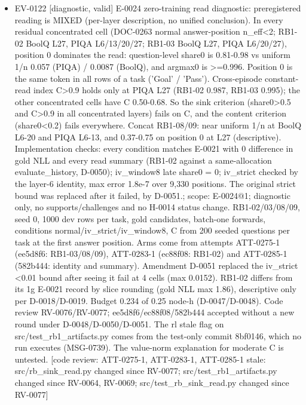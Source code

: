 \documentclass[11pt]{article}
\begin{document}
\begin{itemize}
\item EV-0122 [diagnostic, valid] E-0024 zero-training read diagnostic: preregistered reading is MIXED (per-layer description, no unified conclusion). In every residual concentrated cell (DOC-0263 normal answer-position n\_eff\textless{}2; RB1-02 BoolQ L27, PIQA L6/13/20/27; RB1-03 BoolQ L27, PIQA L6/20/27), position 0 dominates the read: question-level share0 is 0.81-0.98 vs uniform 1/n 0.057 (PIQA) / 0.0087 (BoolQ), and argmax0 is \textgreater{}=0.996. Position 0 is the same token in all rows of a task ('Goal' / 'Pass'). Cross-episode constant-read index C\textgreater{}0.9 holds only at PIQA L27 (RB1-02 0.987, RB1-03 0.995); the other concentrated cells have C 0.50-0.68. So the sink criterion (share0\textgreater{}0.5 and C\textgreater{}0.9 in all concentrated layers) fails on C, and the content criterion (share0\textless{}0.2) fails everywhere. Concat RB1-08/09: near uniform 1/n at BoolQ L6-20 and PIQA L6-13, and 0.37-0.75 on position 0 at L27 (descriptive). Implementation checks: every condition matches E-0021 with 0 difference in gold NLL and every read summary (RB1-02 against a same-allocation evaluate\_history, D-0050); iv\_window8 late share0 = 0; iv\_strict checked by the layer-6 identity, max error 1.8e-7 over 9,330 positions. The original strict bound was replaced after it failed, by D-0051.; scope: E-0024@1; diagnostic only, no supports/challenges and no H-0014 status change. RB1-02/03/08/09, seed 0, 1000 dev rows per task, gold candidates, batch-one forwards, conditions normal/iv\_strict/iv\_window8, C from 200 seeded questions per task at the first answer position. Arms come from attempts ATT-0275-1 (ee5d8f6: RB1-03/08/09), ATT-0283-1 (ec88f08: RB1-02) and ATT-0285-1 (582b444: identity and summary). Amendment D-0051 replaced the iv\_strict \textless{}0.01 bound after seeing it fail at 4 cells (max 0.0152). RB1-02 differs from its 1g E-0021 record by slice rounding (gold NLL max 1.86), descriptive only per D-0018/D-0019. Budget 0.234 of 0.25 node-h (D-0047/D-0048). Code review RV-0076/RV-0077; ee5d8f6/ec88f08/582b444 accepted without a new round under D-0048/D-0050/D-0051. The rl stale flag on src/test\_rb1\_artifacts.py comes from the test-only commit 8bf0146, which no run executes (MSG-0739). The value-norm explanation for moderate C is untested. [code review: ATT-0275-1, ATT-0283-1, ATT-0285-1 stale: src/rb\_sink\_read.py changed since RV-0077; src/test\_rb1\_artifacts.py changed since RV-0064, RV-0069; src/test\_rb\_sink\_read.py changed since RV-0077]

\end{itemize}
\end{document}
